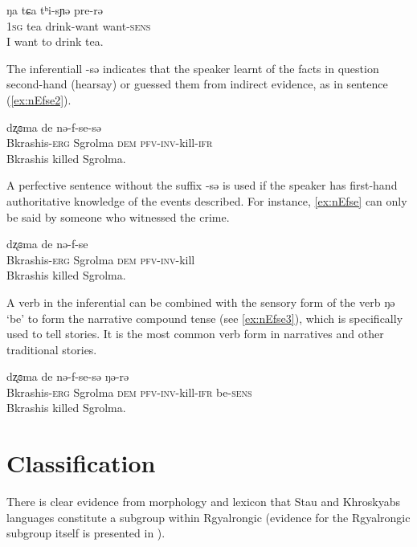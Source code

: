 \documentclass[oneside,a4paper,11pt]{article}
\newcommand{\ipa}[1]{{\phon#1}} %
\begin{document}
\begin{exe}
\ex \label{ex:prerE}
\gll
\ipa{ŋa} 	\ipa{tɕa} 	\ipa{tʰi-sɲə} 	\ipa{pre-rə} \\
\textsc{1sg} tea drink-want want-\textsc{sens} \\
\glt I want to drink tea.
\end{exe}

The inferentiall \ipa{-sə} indicates that the speaker learnt of the facts in question second-hand (hearsay) or guessed them from indirect evidence, as in sentence (\ref{ex:nEfse2}).

\begin{exe}
\ex \label{ex:nEfse2}
\gll \ipa{tʂaɕi-w} 	\ipa{dʐɞma} 	\ipa{de} 	\ipa{nə-f-se-sə}  \\
Bkrashis-\textsc{erg} Sgrolma \textsc{dem} \textsc{pfv-inv}-kill-\textsc{ifr} \\
\glt Bkrashis killed Sgrolma.
\end{exe}

A perfective sentence without the suffix  \ipa{-sə} is used if the speaker has first-hand authoritative knowledge of the events described. For instance, \ref{ex:nEfse} can only be said by someone who witnessed the crime.


\begin{exe}
\ex \label{ex:nEfse}
\gll \ipa{tʂaɕi-w} 	\ipa{dʐɞma} 	\ipa{de} 	\ipa{nə-f-se}  \\
Bkrashis-\textsc{erg} Sgrolma \textsc{dem} \textsc{pfv-inv}-kill \\
\glt Bkrashis killed Sgrolma.
\end{exe}

 

A verb in the inferential can be combined with the sensory form of the verb \ipa{ŋə} `be' to form the narrative compound tense (see \ref{ex:nEfse3}), which is specifically used to tell stories. It is the most common verb form in narratives and other traditional stories.

\begin{exe}
\ex \label{ex:nEfse3}
\gll \ipa{tʂaɕi-w} 	\ipa{dʐɞma} 	\ipa{de} 	\ipa{nə-f-se-sə}  \ipa{ŋə-rə} \\
Bkrashis-\textsc{erg} Sgrolma \textsc{dem} \textsc{pfv-inv}-kill-\textsc{ifr} be-\textsc{sens} \\
\glt Bkrashis killed Sgrolma.
\end{exe}
 

 
 
 
\section{Classification} \label{sec:classification}
 There is clear evidence from morphology and lexicon that Stau and Khroskyabs languages constitute a subgroup within Rgyalrongic (evidence for the Rgyalrongic subgroup itself is presented in \citealt{jackson00puxi}).
 
\end{document}
